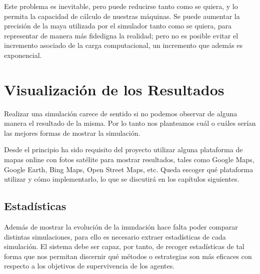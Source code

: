 Este problema es inevitable, pero puede reducirse tanto como se quiera, y lo
permita la capacidad de cálculo de nuestras máquinas. Se puede aumentar la
precisión de la maya utilizada por el simulador tanto como se quiera, para
representar de manera más fidedigna la realidad; pero no es posible evitar el
incremento asociado de la carga computacional, un incremento que además es
exponencial.

\section*{Visualización de los Resultados}

Realizar una simulación carece de sentido si no podemos observar de alguna
manera el resultado de la misma. Por lo tanto nos planteamos cuál o cuáles
serían las mejores formas de mostrar la simulación.

Desde el principio ha sido requisito del proyecto utilizar alguna plataforma de
mapas online con fotos satélite para mostrar resultados, tales como Google Maps,
Google Earth, Bing Maps, Open Street Maps, etc. Queda escoger qué plataforma
utilizar y cómo implementarlo, lo que se discutirá en los capítulos siguientes.

\subsection*{Estadísticas}

Además de mostrar la evolución de la inundación hace falta poder comparar
distintas simulaciones, para ello es necesario extraer estadísticas de cada
simulación. El sistema debe ser capaz, por tanto, de recoger estadísticas de tal
forma que nos permitan discernir qué métodos o estrategias son más eficaces con
respecto a los objetivos de supervivencia de los agentes.

